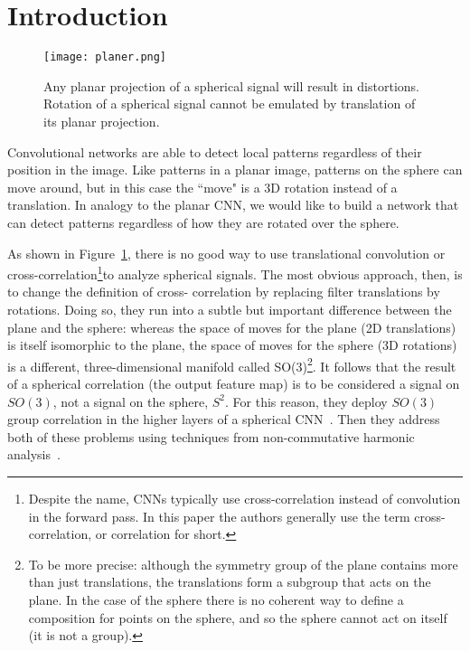 \documentclass[10pt,twocolumn,letterpaper]{article}
\begin{document}
\section{Introduction}
   \begin{figure}[!htb]
 \centering
 \texttt{[image: planer.png]}\\
 \caption{Any planar projection of a spherical signal will result in distortions. Rotation of a spherical signal cannot be emulated by translation of its planar projection.}\label{Figure1}
 \end{figure}
Convolutional networks are able to detect local patterns regardless
of their position in the image. Like patterns in a planar image,
patterns on the sphere can move around, but in this case the ``move"
is a 3D rotation instead of a translation. In analogy to the planar
CNN, we would like to build a network that can detect patterns
regardless of how they are rotated over the sphere.
\par As shown in Figure~\ref{Figure1}, there is no good way to use translational
convolution or cross-correlation\footnote{Despite the name, CNNs typically use cross-correlation instead of convolution in the forward pass. In this paper the authors  generally use the term cross-correlation, or correlation for short.}to analyze spherical signals. The
most obvious approach, then, is to change the definition of cross-
correlation by replacing filter translations by rotations. Doing so,
they run into a subtle but important difference between the plane
and the sphere: whereas the space of moves for the plane (2D
translations) is itself isomorphic to the plane, the space of moves
for the sphere (3D rotations) is a different, three-dimensional
manifold called SO(3)\footnote{To be more precise: although the symmetry group of the plane contains more than just translations, the translations form a subgroup that acts on the plane. In the case of the sphere there is no coherent way to define a composition for points on the sphere, and so the sphere cannot act on itself (it is not a group).}. It follows that the result of a spherical
correlation (the output feature map) is to be considered a signal on $SO(3)$, not a signal on the sphere, $S^2$. For this reason, they deploy $SO(3)$ group correlation in the higher layers of a spherical CNN~\cite{name1}. Then they address both of these problems using techniques from non-commutative harmonic analysis~\cite{name2,name3}. 
\end{document}
